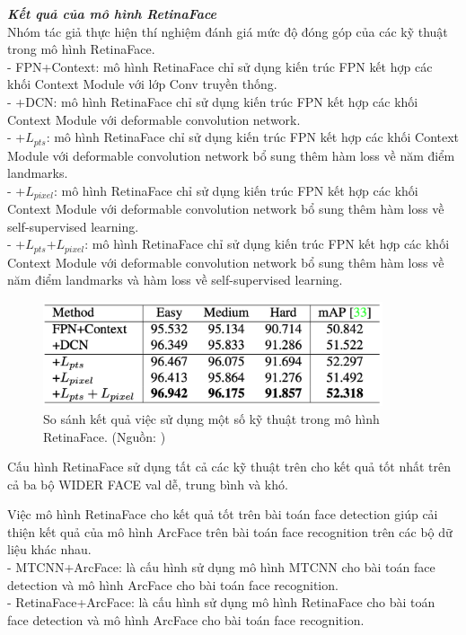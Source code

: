 {    \noindent
    \textbf{\textit{Kết quả của mô hình RetinaFace}} \\
    Nhóm tác giả thực hiện thí nghiệm đánh giá mức độ đóng góp của các kỹ thuật trong mô hình RetinaFace. \\
    - FPN+Context: mô hình RetinaFace chỉ sử dụng kiến trúc FPN kết hợp các khối Context Module với lớp Conv truyền thống. \\
    - +DCN: mô hình RetinaFace chỉ sử dụng kiến trúc FPN kết hợp các khối Context Module với deformable convolution network. \\
    - +$L_{pts}$: mô hình RetinaFace chỉ sử dụng kiến trúc FPN kết hợp các khối Context Module với deformable convolution network bổ sung thêm hàm loss về năm điểm landmarks. \\
    - +$L_{pixel}$: mô hình RetinaFace chỉ sử dụng kiến trúc FPN kết hợp các khối Context Module với deformable convolution network bổ sung thêm hàm loss về self-supervised learning. \\
    - +$L_{pts}$+$L_{pixel}$: mô hình RetinaFace chỉ sử dụng kiến trúc FPN kết hợp các khối Context Module với deformable convolution network bổ sung thêm hàm loss về năm điểm landmarks và hàm loss về self-supervised learning. \\

    \begin{figure}[H]
        \centering
        \includegraphics[width=10cm] {images/retinaface_results_1}
        \caption{So sánh kết quả việc sử dụng một số kỹ thuật trong mô hình RetinaFace. (Nguồn: \cite{deng2020retinaface})}
        \label{fig:retinaface_results_1}
    \end{figure}

    \noindent
    Cấu hình RetinaFace sử dụng tất cả các kỹ thuật trên cho kết quả tốt nhất trên cả ba bộ WIDER FACE val dễ, trung bình và khó.

    \noindent
    Việc mô hình RetinaFace cho kết quả tốt trên bài toán face detection giúp cải thiện kết quả của mô hình ArcFace trên bài toán face recognition trên các bộ dữ liệu khác nhau. \\
    - MTCNN+ArcFace: là cấu hình sử dụng mô hình MTCNN cho bài toán face detection và mô hình ArcFace cho bài toán face recognition. \\
    - RetinaFace+ArcFace: là cấu hình sử dụng mô hình RetinaFace cho bài toán face detection và mô hình ArcFace cho bài toán face recognition.

}
